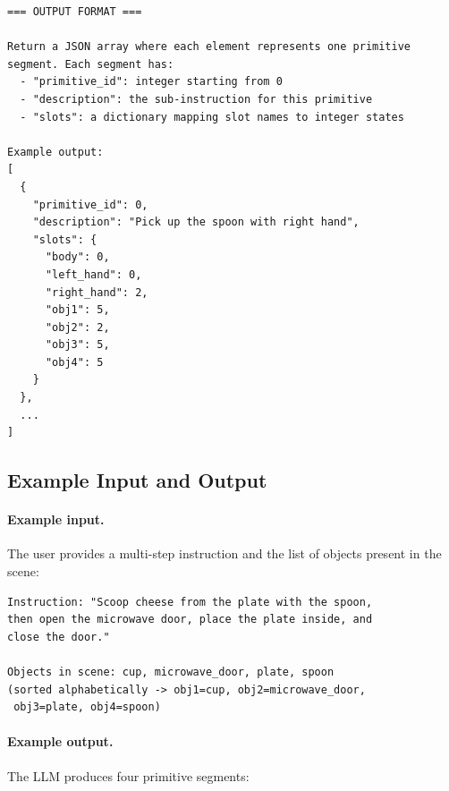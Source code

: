 \documentclass[sigconf, screen, review, anonymous]{acmart}
\begin{document}
\begin{lstlisting}[style=prompt]
=== OUTPUT FORMAT ===

Return a JSON array where each element represents one primitive
segment. Each segment has:
  - "primitive_id": integer starting from 0
  - "description": the sub-instruction for this primitive
  - "slots": a dictionary mapping slot names to integer states

Example output:
[
  {
    "primitive_id": 0,
    "description": "Pick up the spoon with right hand",
    "slots": {
      "body": 0,
      "left_hand": 0,
      "right_hand": 2,
      "obj1": 5,
      "obj2": 2,
      "obj3": 5,
      "obj4": 5
    }
  },
  ...
]
\end{lstlisting}

\subsection{Example Input and Output}

\paragraph{Example input.}
The user provides a multi-step instruction and the list of objects present in the scene:

\begin{lstlisting}[style=prompt]
Instruction: "Scoop cheese from the plate with the spoon,
then open the microwave door, place the plate inside, and
close the door."

Objects in scene: cup, microwave_door, plate, spoon
(sorted alphabetically -> obj1=cup, obj2=microwave_door,
 obj3=plate, obj4=spoon)
\end{lstlisting}

\paragraph{Example output.}
The LLM produces four primitive segments:
\end{document}
